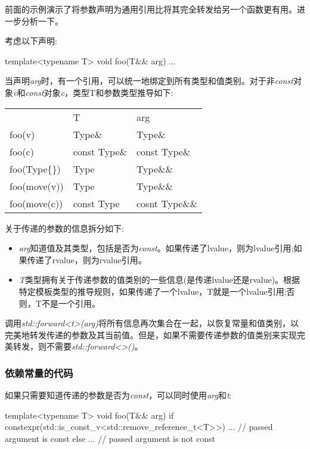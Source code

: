 前面的示例演示了将参数声明为通用引用比将其完全转发给另一个函数更有用。进一步分析一下。

考虑以下声明:

\begin{cppcode}
template<typename T>
void foo(T&& arg) {
	...
}
\end{cppcode}

当声明\textit{arg}时，有一个引用，可以统一地绑定到所有类型和值类别。对于非\textit{const}对象\textit{v}和\textit{const}对象\textit{c}，类型T和参数类型推导如下:

\begin{table}[H]
	\begin{tabular}{lll}
		& T            & arg            \\
		foo(v)        & Type\&       & Type\&         \\
		foo(c)        & const Type\& & const Type\&   \\
		foo(Type\{\}) & Type         & Type\&\&       \\
		foo(move(v))  & Type         & Type\&\&       \\
		foo(move(c))  & const Type   & cosnt Type\&\&
	\end{tabular}
\end{table}

关于传递的参数的信息拆分如下:

\begin{itemize}
	\item \textit{arg}知道值及其类型，包括是否为\textit{const}。如果传递了lvalue，则为lvalue引用;如果传递了rvalue，则为rvalue引用。
	\item \textit{T}类型拥有关于传递参数的值类别的一些信息(是传递lvalue还是rvalue)。根据特定模板类型的推导规则，如果传递了一个lvalue，T就是一个lvalue引用;否则，T不是一个引用。
\end{itemize}

调用\textit{std::forward<t>(arg)}将所有信息再次集合在一起，以恢复常量和值类别，以完美地转发传递的参数及其当前值。但是，如果不需要传递参数的值类别来实现完美转发，则不需要\textit{std::forward<>()}。

\subsubsection{依赖常量的代码}

如果只需要知道传递的参数是否为\textit{const}，可以同时使用\textit{arg}和\textit{t}:

\begin{cppcode}
template<typename T>
void foo(T&& arg)
{
	if constexpr(std::is_const_v<std::remove_reference_t<T>>) {
		... // passed argument is const
	}
	else {
		... // passed argument is not const
	}
}
\end{cppcode}


